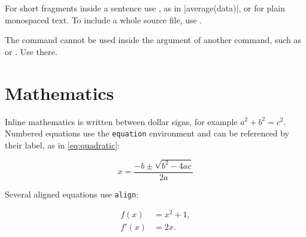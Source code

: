 For short fragments inside a sentence use , as in
\code|average(data)|, or  for plain monospaced text. To include
a whole source file, use .

\begin{warning}
The  command cannot be used inside the argument of another
command, such as  or . Use  there.
\end{warning}

\section{Mathematics}\label{sec:math}

Inline mathematics is written between dollar signs, for example
$a^2 + b^2 = c^2$. Numbered equations use the \texttt{equation} environment
and can be referenced by their label, as in \cref{eq:quadratic}:

\begin{equation}\label{eq:quadratic}
  x = \frac{-b \pm \sqrt{b^{2} - 4ac}}{2a}
\end{equation}

Several aligned equations use \texttt{align}:

\begin{align}
  f(x)  &= x^2 + 1, \label{eq:f} \\
  f'(x) &= 2x.      \label{eq:fprime}
\end{align}
